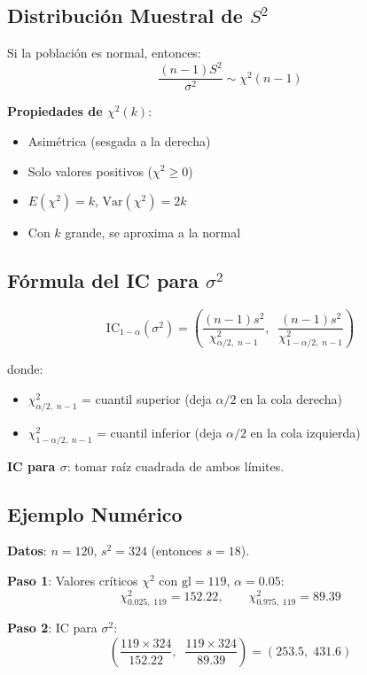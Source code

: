 \documentclass[11pt, a4paper]{article}
\begin{document}
\subsection{Distribuci\'on Muestral de $S^2$}

Si la poblaci\'on es normal, entonces:
\[
\frac{(n-1)S^2}{\sigma^2} \sim \chi^2(n-1)
\]

\textbf{Propiedades de $\chi^2(k)$}:
\begin{itemize}
  \item Asim\'etrica (sesgada a la derecha)
  \item Solo valores positivos ($\chi^2 \geq 0$)
  \item $E(\chi^2) = k$, \; $\text{Var}(\chi^2) = 2k$
  \item Con $k$ grande, se aproxima a la normal
\end{itemize}

\subsection{F\'ormula del IC para $\sigma^2$}

\[
\boxed{\text{IC}_{1-\alpha}(\sigma^2) = \left(\frac{(n-1)s^2}{\chi^2_{\alpha/2,\; n-1}}, \;\; \frac{(n-1)s^2}{\chi^2_{1-\alpha/2,\; n-1}}\right)}
\]

donde:
\begin{itemize}
  \item $\chi^2_{\alpha/2,\; n-1}$ = cuantil superior (deja $\alpha/2$ en la cola derecha)
  \item $\chi^2_{1-\alpha/2,\; n-1}$ = cuantil inferior (deja $\alpha/2$ en la cola izquierda)
\end{itemize}

\textbf{IC para $\sigma$}: tomar ra\'iz cuadrada de ambos l\'imites.

\subsection{Ejemplo Num\'erico}

\textbf{Datos}: $n = 120$, $s^2 = 324$ (entonces $s = 18$).

\textbf{Paso 1}: Valores cr\'iticos $\chi^2$ con $\text{gl} = 119$, $\alpha = 0.05$:
\[
\chi^2_{0.025,\; 119} = 152.22, \qquad \chi^2_{0.975,\; 119} = 89.39
\]

\textbf{Paso 2}: IC para $\sigma^2$:
\[
\left(\frac{119 \times 324}{152.22}, \;\; \frac{119 \times 324}{89.39}\right) = (253.5, \; 431.6)
\]
\end{document}
